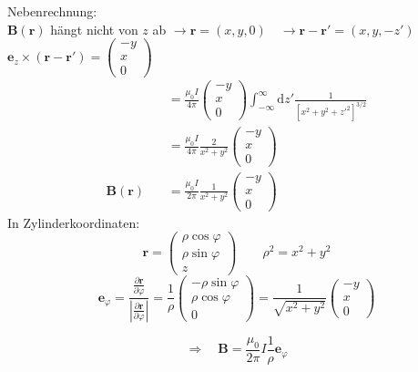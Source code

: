 \documentclass[titlepage,11pt,a4paper,ngerman]{report}
\newcommand{\tx}[1]{\textrm{#1}}
\newcommand{\dd}{\tx{d}}
\newcommand{\prt}[2]{\frac{\partial #1}{\partial #2}}
\renewcommand{\vec}[1]{\boldsymbol{#1}}
\begin{document}
Nebenrechnung:\\
$ \vec{B}(\vec{r}) $ hängt nicht von $ z $ ab $ \rightarrow \vec{r} = (x,y,0) \quad \rightarrow \vec{r} - \vec{r}' = (x,y,-z') $\\
$ \vec{e}_z \times (\vec{r} - \vec{r}') = \begin{pmatrix}
-y \\ x \\ 0
\end{pmatrix} $
\begin{align*}
\qquad \qquad &= \frac{\mu_0 I}{4 \pi} \begin{pmatrix}
-y \\ x \\ 0
\end{pmatrix} \int_{-\infty}^{\infty} \dd z' \frac{1}{[x^2 + y^2 + z'^2]^{3/2}}\\
&= \frac{\mu_0 I}{4 \pi} \frac{2}{x^2 + y^2} \begin{pmatrix}
-y \\ x \\ 0
\end{pmatrix}\\
\vec{B} (\vec{r}) &= \frac{\mu_0 I}{2 \pi} \frac{1}{x^2 + y^2} \begin{pmatrix}
-y \\ x \\ 0
\end{pmatrix}
\end{align*}
In Zylinderkoordinaten:
\begin{equation*}
\vec{r} = \begin{pmatrix}
\rho \cos \varphi \\ \rho \sin \varphi \\ z
\end{pmatrix} \qquad \rho^2 = x^2 + y^2
\end{equation*}
\begin{equation*}
\vec{e}_{\varphi} = \frac{\prt{\vec{r}}{\varphi}}{|\prt{\vec{r}}{\varphi}|} = \frac{1}{\rho} \begin{pmatrix}
- \rho \sin \varphi \\ \rho \cos \varphi \\ 0
\end{pmatrix} = \frac{1}{\sqrt{x^2 + y^2}} \begin{pmatrix}
-y \\ x \\ 0
\end{pmatrix}
\end{equation*}
\begin{minipage}{.5\linewidth}
	\begin{equation*}
	\Rightarrow \quad \vec{B} = \frac{\mu_0}{2 \pi} I \frac{1}{\rho} \vec{e}_{\varphi}
	\end{equation*}
\end{minipage}%
\end{document}
